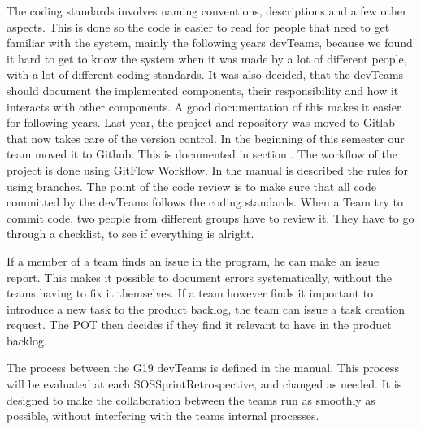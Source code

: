 The coding standards involves naming conventions, descriptions and a few other aspects. This is done so the code is easier to read for people that need to get familiar with the system, mainly the following years \glspl{devTeam}, because we found it hard to get to know the system when it was made by a lot of different people, with a lot of different coding standards.
It was also decided, that the \glspl{devTeam} should document the implemented components, their responsibility and how it interacts with other components. A good documentation of this makes it easier for following years. 
Last year, the project and repository was moved to Gitlab that now takes care of the version control. In the beginning of this semester our team moved it to Github. This is documented in section . The workflow of the project is done using GitFlow Workflow. In the manual is described the rules for using branches. 
The point of the code review is to make sure that all code committed by the \glspl{devTeam} follows the coding standards. When a Team try to commit code, two people from different groups have to review it. They have to go through a checklist, to see if everything is alright. 

If a member of a team finds an issue in the program, he can make an issue report. This makes it possible to document errors systematically, without the \glspl{team} having to fix it themselves. If a \gls{team} however finds it important to introduce a new task to the product backlog, the team can issue a task creation request. The \gls{POT} then decides if they find it relevant to have in the product backlog. 

The process between the \gls{G19} \glspl{devTeam} is defined in the manual. This process will be evaluated at each \gls{SOSSprintRetrospective}, and changed as needed. It is designed to make the collaboration between the \glspl{team} run as smoothly as possible, without interfering with the \glspl{team} internal processes.  
